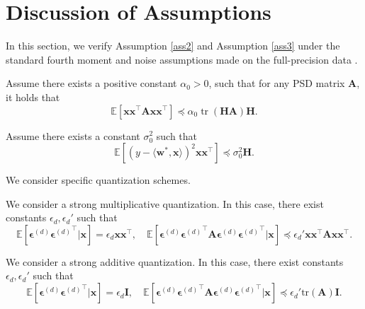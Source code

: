 \documentclass[11pt, letterpaper]{article}
\begin{document}
\section{Discussion of Assumptions}
\label{Discussion of Assumptions}
In this section, we verify Assumption \ref{ass2} and Assumption \ref{ass3} under the standard fourth moment and noise assumptions made on the full-precision data \citep{zou2023benign}.
\begin{assumption}
\label{ass2 raw data}
    Assume there exists a positive constant $\alpha_0>0$, such that for any PSD matrix $\mathbf{A}$, it holds that
    \begin{equation*}
        \mathbb{E}\left[{\mathbf{x}}{\mathbf{x}}^\top\mathbf{A}{\mathbf{x}}{\mathbf{x}}^\top\right]\preceq\alpha_0\operatorname{tr}(\mathbf{H}\mathbf{A})\mathbf{H}.
    \end{equation*}
\end{assumption}
\begin{assumption}
\label{assumption noise raw}
    Assume there exists a constant $\sigma_0^2$ such that
    \begin{equation*}
        \mathbb{E}\left[(y-\langle \mathbf{w}^*,\mathbf{x}\rangle)^2\mathbf{x}\mathbf{x}^\top\right]\preceq\sigma_0^{2}\mathbf{H}.
    \end{equation*}
\end{assumption}
We consider specific quantization schemes.
\begin{example}
\label{example G1}
    We consider a strong multiplicative quantization. In this case, there exist constants $\epsilon_d,\epsilon_d'$ such that
    \begin{equation*}
          \mathbb{E}\left[\boldsymbol{\epsilon}^{(d)}{\boldsymbol{\epsilon}^{(d)}}^\top\big| \mathbf{x}\right]=\epsilon_d\mathbf{x}\mathbf{x}^\top,\quad\mathbb{E}\left[\boldsymbol{\epsilon}^{(d)}{\boldsymbol{\epsilon}^{(d)}}^\top\mathbf{A}\boldsymbol{\epsilon}^{(d)}{\boldsymbol{\epsilon}^{(d)}}^\top\Big| \mathbf{x}\right]\preceq \epsilon_d' \mathbf{x}\mathbf{x}^\top \mathbf{A}\mathbf{x}\mathbf{x}^\top.
    \end{equation*}
\end{example}
\begin{example}
\label{exampleG2}
    We consider a strong additive quantization. In this case, there exist constants $\epsilon_d, \epsilon_d'$ such that
    \begin{equation}                    
        \mathbb{E}\left[\boldsymbol{\epsilon}^{(d)}{\boldsymbol{\epsilon}^{(d)}}^\top\big| \mathbf{x}\right]=\epsilon_d\mathbf{I},\quad\mathbb{E}\left[\boldsymbol{\epsilon}^{(d)}{\boldsymbol{\epsilon}^{(d)}}^\top\mathbf{A}\boldsymbol{\epsilon}^{(d)}{\boldsymbol{\epsilon}^{(d)}}^\top\Big| \mathbf{x}\right]\preceq \epsilon_d' \mathrm{tr}(\mathbf{A})\mathbf{I}.
    \end{equation}
\end{example}
\end{document}
